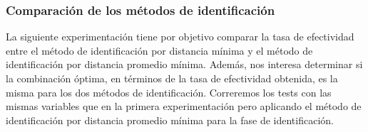 \subsubsection{Comparación de los métodos de identificación}
La siguiente experimentación tiene por objetivo comparar la tasa de efectividad entre el método de identificación por distancia mínima
y el método de identificación por distancia promedio mínima. Además, nos interesa determinar si la combinación óptima, en términos de 
la tasa de efectividad obtenida, es la misma para los dos métodos de identificación. Correremos los tests con las mismas variables que
en la primera experimentación pero aplicando el método de identificación por distancia promedio mínima para la fase de identificación.